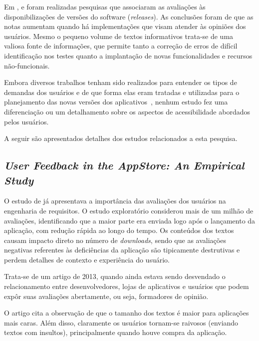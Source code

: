 Em \cite{Palomba2015userreviews}, \cite{Palomba2018crowdsourcing} e \cite{Li2018MobileAE} foram realizadas pesquisas que associaram as avaliações às disponibilizações de versões do software (\textit{releases}). As conclusões foram de que as notas aumentam quando há implementações que visam atender às opiniões dos usuários. Mesmo o pequeno volume de textos informativos trata-se de uma valiosa fonte de informações, que permite tanto a correção de erros de difícil identificação nos testes quanto a implantação de novas funcionalidades e recursos não-funcionais.

Embora diversos trabalhos tenham sido realizados para entender os tipos de demandas dos usuários e de que forma elas eram tratadas e utilizadas para o planejamento das novas versões dos aplicativos~\cite{Iacob2013retrieving,Pagano2013userfeedback,Iacob2014online,Mcilroy2016analyzing,Sorbo2017surf,Ciurumelea2017analyzing,Li2018MobileAE,Pelloni2018becloma,Panichella2015how}, nenhum estudo fez uma diferenciação ou um detalhamento sobre os aspectos de acessibilidade abordados pelos usuários. 



A seguir são apresentados detalhes dos estudos relacionados a esta pesquisa.

\subsection{\textit{User Feedback in the AppStore: An Empirical Study}}
O estudo de  já apresentava a importância das avaliações dos usuários na engenharia de requisitos. O estudo exploratório considerou mais de um milhão de avaliações, identificando que a maior parte era enviada logo após o lançamento da aplicação, com redução rápida ao longo do tempo. Os conteúdos dos textos causam impacto direto no número de \textit{downloads}, sendo que as avaliações negativas referentes às deficiências da aplicação são tipicamente destrutivas e perdem detalhes de contexto e experiência do usuário.

Trata-se de um artigo de 2013, quando ainda estava sendo desvendado o relacionamento entre desenvolvedores, lojas de aplicativos e usuários que podem expôr suas avaliações abertamente, ou seja, formadores de opinião.

O artigo cita a observação de que o tamanho dos textos é maior para aplicações mais caras. Além disso, claramente os usuários tornam-se raivosos (enviando textos com insultos), principalmente quando houve compra da aplicação.


